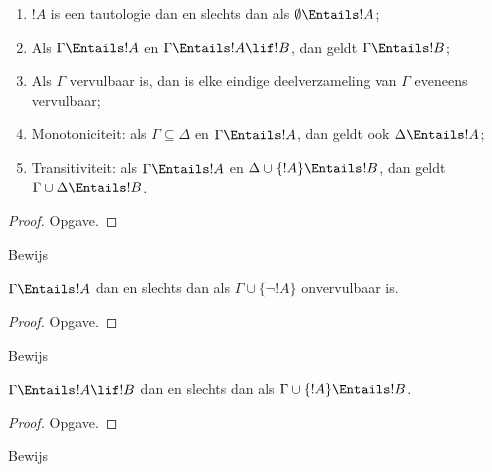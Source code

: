 \documentclass[../../../include/open-logic-section]{subfiles}
\begin{document}
\begin{prop}
\begin{enumerate} 
\item $!A$ is een tautologie dan en slechts dan als
  $\emptyset \Entails !A$; 
\item Als $\Gamma \Entails !A$ en $\Gamma \Entails !A \lif !B$, dan
  geldt $\Gamma \Entails !B$;
\item Als $\Gamma$ vervulbaar is, dan is elke eindige deelverzameling
  van $\Gamma$ eveneens vervulbaar; 
\item {} Monotoniciteit: als
  $\Gamma \subseteq \Delta$ en $\Gamma \Entails !A$, dan geldt ook
  $\Delta \Entails !A$;
\item {} Transitiviteit: als $\Gamma \Entails !A$ en
  $\Delta \cup \{ !A\} \Entails !B$, dan geldt
  $\Gamma \cup \Delta \Entails !B$.
\end{enumerate}
\end{prop}

\begin{proof}
Opgave.
\end{proof}

\begin{prob}
Bewijs 
\end{prob}

\begin{prop}
  $\Gamma \Entails !A$ dan en slechts dan als
  $\Gamma \cup \{\lnot !A\}$ onvervulbaar is.
\end{prop}

\begin{proof}
Opgave.
\end{proof}

\begin{prob}
Bewijs 
\end{prob}

\begin{thm}
   $\Gamma \Entails !A \lif !B$ dan en
  slechts dan als $\Gamma \cup \{!A\} \Entails !B$.
\end{thm}

\begin{proof}
Opgave.
\end{proof}

\begin{prob}
Bewijs 
\end{prob}
\end{document}
